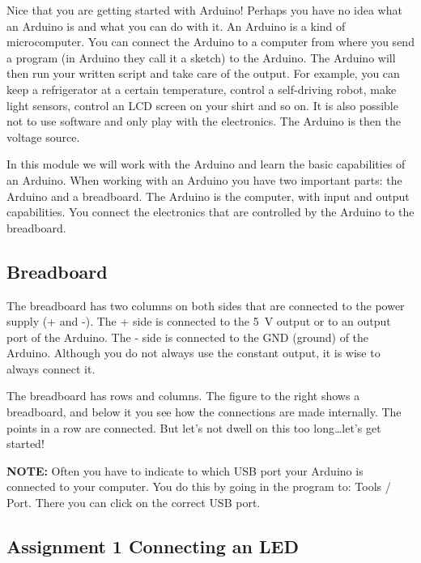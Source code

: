 \documentclass{arduino}
\begin{document}
Nice that you are getting started with Arduino! Perhaps you have no idea what an Arduino is and what you can do with it. An Arduino is a kind of microcomputer. You can connect the Arduino to a computer from where you send a program (in Arduino they call it a sketch) to the Arduino. The Arduino will then run your written script and take care of the output. For example, you can keep a refrigerator at a certain temperature, control a self-driving robot, make light sensors, control an LCD screen on your shirt and so on. It is also possible not to use software and only play with the electronics. The Arduino is then the voltage source.

In this module we will work with the Arduino and learn the basic capabilities of an Arduino. When working with an Arduino you have two important parts: the Arduino and a breadboard. The Arduino is the computer, with input and output capabilities. You connect the electronics that are controlled by the Arduino to the breadboard.

\subsection{Breadboard}

The breadboard has two columns on both sides that are connected to the power supply (+ and -). The + side is connected to the \SI{5}{\volt} output or to an output port of the Arduino. The - side is connected to the GND (ground) of the Arduino. Although you do not always use the constant output, it is wise to always connect it.

The breadboard has rows and columns. The figure to the right shows a breadboard, and below it you see how the connections are made internally. The points in a row are connected. But let's not dwell on this too long\dots let's get started!

\textbf{NOTE:} Often you have to indicate to which USB port your Arduino is connected to your computer. You do this by going in the program to: Tools / Port. There you can click on the correct USB port.

\newpage

\subsection{Assignment 1 Connecting an LED}
\end{document}
